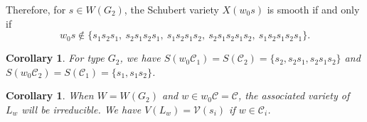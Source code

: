 \documentclass[11pt, reqno]{amsart}
\newtheorem{cor}[Thm]{Corollary}
\theoremstyle{definition}
\numberwithin{equation}{section}
\begin{document}

Therefore,  for $s \in W(G_2)$, the Schubert variety $X(w_0 s)$ is smooth if and only if \[w_0 s \notin \{ s_1 s_2 s_1,\ s_2 s_1 s_2 s_1,\ s_1 s_2 s_1 s_2,\ s_2 s_1 s_2 s_1 s_2,\ s_1 s_2 s_1 s_2 s_1 \}.\]


\begin{cor}
For type $G_2$,     we have $S(w_0\mathcal{C}_{1})=S(\mathcal{C}_{2})=\{s_2,s_2s_1,s_2s_1s_2\}$ and $S(w_0\mathcal{C}_{2})=S(\mathcal{C}_{1})=\{s_1,s_1s_2\}$.
\end{cor}

\begin{cor}
    When $W=W(G_2)$ and $w\in w_0\mathcal{C}=\mathcal{C}$, the associated variety of $L_w$ will be irreducible. We have $V(L_w)=\mathcal{V}(s_i)$ if  $w\in \mathcal{C}_{i}$.
\end{cor}
\end{document}
